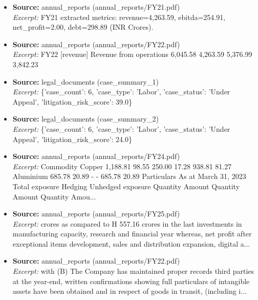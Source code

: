 \documentclass[11pt,a4paper]{article}
\begin{document}
\begin{itemize}
\item \textbf{Source:} annual\_reports (annual\_reports/FY21.pdf) \\ \textit{Excerpt:} FY21 extracted metrics: revenue=4,263.59, ebitda=254.91, net\_profit=2.00, debt=298.89 (INR Crores).
\item \textbf{Source:} annual\_reports (annual\_reports/FY22.pdf) \\ \textit{Excerpt:} FY22 [revenue] Revenue from operations                                  6,045.58               4,263.59            5,376.99               3,842.23
\item \textbf{Source:} legal\_documents (case\_summary\_1) \\ \textit{Excerpt:} \{'case\_count': 6, 'case\_type': 'Labor', 'case\_status': 'Under Appeal', 'litigation\_risk\_score': 39.0\}
\item \textbf{Source:} legal\_documents (case\_summary\_2) \\ \textit{Excerpt:} \{'case\_count': 6, 'case\_type': 'Labor', 'case\_status': 'Under Appeal', 'litigation\_risk\_score': 24.0\}
\item \textbf{Source:} annual\_reports (annual\_reports/FY24.pdf) \\ \textit{Excerpt:} Commodity Copper 1,188.81 98.55 250.00 17.28 938.81 81.27 Aluminium 685.78 20.89 - - 685.78 20.89 Particulars As at March 31, 2023 Total exposure Hedging Unhedged exposure Quantity Amount Quantity Amount Quantity Amou...
\item \textbf{Source:} annual\_reports (annual\_reports/FY25.pdf) \\ \textit{Excerpt:} crores as compared to H 557.16 crores in the last investments in manufacturing capacity, research and financial year whereas, net profit after exceptional items development, sales and distribution expansion, digital a...
\item \textbf{Source:} annual\_reports (annual\_reports/FY22.pdf) \\ \textit{Excerpt:} with (B) The Company has maintained proper records third parties at the year-end, written confirmations showing full particulars of intangible assets have been obtained and in respect of goods in transit, (including i...
\end{itemize}
\end{document}
